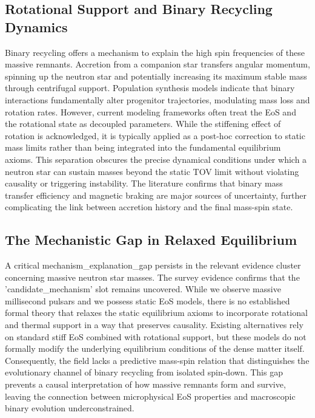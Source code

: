 \documentclass[conference]{IEEEtran}
\begin{document}
\subsection{Rotational Support and Binary Recycling Dynamics}
Binary recycling offers a mechanism to explain the high spin frequencies of these massive remnants. Accretion from a companion star transfers angular momentum, spinning up the neutron star and potentially increasing its maximum stable mass through centrifugal support. Population synthesis models indicate that binary interactions fundamentally alter progenitor trajectories, modulating mass loss and rotation rates. However, current modeling frameworks often treat the EoS and the rotational state as decoupled parameters. While the stiffening effect of rotation is acknowledged, it is typically applied as a post-hoc correction to static mass limits rather than being integrated into the fundamental equilibrium axioms. This separation obscures the precise dynamical conditions under which a neutron star can sustain masses beyond the static TOV limit without violating causality or triggering instability. The literature confirms that binary mass transfer efficiency and magnetic braking are major sources of uncertainty, further complicating the link between accretion history and the final mass-spin state.~\cite{cite_1e5d552669fc0c56,cite_c369df652181e8f7}

\subsection{The Mechanistic Gap in Relaxed Equilibrium}
A critical mechanism\_explanation\_gap persists in the relevant evidence cluster concerning massive neutron star masses. The survey evidence confirms that the 'candidate\_mechanism' slot remains uncovered. While we observe massive millisecond pulsars and we possess static EoS models, there is no established formal theory that relaxes the static equilibrium axioms to incorporate rotational and thermal support in a way that preserves causality. Existing alternatives rely on standard stiff EoS combined with rotational support, but these models do not formally modify the underlying equilibrium conditions of the dense matter itself. Consequently, the field lacks a predictive mass-spin relation that distinguishes the evolutionary channel of binary recycling from isolated spin-down. This gap prevents a causal interpretation of how massive remnants form and survive, leaving the connection between microphysical EoS properties and macroscopic binary evolution underconstrained.
\end{document}
